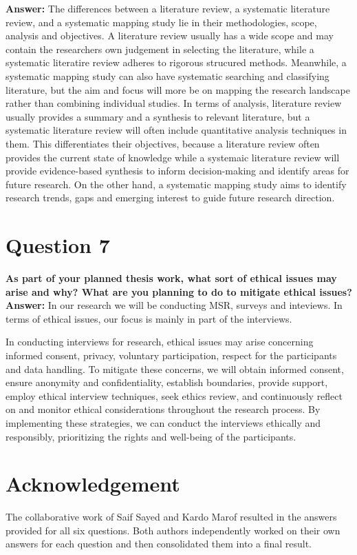 \documentclass[conference]{IEEEtran}
\begin{document}
\textbf{Answer:}
The differences between a literature review, a systematic literature review, and a systematic mapping study lie in their methodologies, scope, analysis and objectives. A literature review usually has a wide scope and may contain the researchers own judgement in selecting the literature, while a systematic literatire review adheres to rigorous strucured methods. Meanwhile, a systematic mapping study can also have systematic searching and classifying literature, but the aim and focus will more be on mapping the research landscape rather than combining individual studies.
In terms of analysis, literature review usually provides a summary and a synthesis to relevant literature, but a systematic literature review will often include quantitative analysis techniques in them. This differentiates their objectives, because a literature review often provides the current state of knowledge while a systemaic literature review will provide evidence-based synthesis to inform decision-making and identify areas for future research. On the other hand, a systematic mapping study aims to identify research trends, gaps and emerging interest to guide future research direction. 



\section{Question 7}

\textbf{As part of your planned thesis work, what sort of ethical issues may arise and why? What are you planning to do to mitigate ethical issues?}\\

\textbf{Answer:} 
In our research we will be conducting MSR, surveys and inteviews. In terms of ethical issues, our focus is mainly in part of the interviews.

In conducting interviews for research, ethical issues may arise concerning informed consent, privacy, voluntary participation, respect for the participants and data handling. To mitigate these concerns, we will obtain informed consent, ensure anonymity and confidentiality, establish boundaries, provide support, employ ethical interview techniques, seek ethics review, and continuously reflect on and monitor ethical considerations throughout the research process. By implementing these strategies, we can conduct the interviews ethically and responsibly, prioritizing the rights and well-being of the participants.



\section{Acknowledgement}
The collaborative work of Saif Sayed and Kardo Marof resulted in the answers provided for all six questions. Both authors independently worked on their own answers for each question and then consolidated them into a final result.
\end{document}
